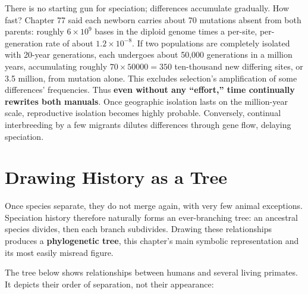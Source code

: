 \begin{qiaoliang}
There is no starting gun for speciation; differences accumulate gradually. How fast? Chapter 77 said each newborn carries about 70 mutations absent from both parents: roughly $6\times10^{9}$ bases in the diploid genome times a per-site, per-generation rate of about $1.2\times10^{-8}$. If two populations are completely isolated with 20-year generations, each undergoes about 50,000 generations in a million years, accumulating roughly $70\times 50000=350$ ten-thousand new differing sites, or 3.5 million, from mutation alone. This excludes selection's amplification of some differences' frequencies. Thus \textbf{even without any ``effort,'' time continually rewrites both manuals}. Once geographic isolation lasts on the million-year scale, reproductive isolation becomes highly probable. Conversely, continual interbreeding by a few migrants dilutes differences through gene flow, delaying speciation.
\end{qiaoliang}

\section{Drawing History as a Tree}

Once species separate, they do not merge again, with very few animal exceptions. Speciation history therefore naturally forms an ever-branching tree: an ancestral species divides, then each branch subdivides. Drawing these relationships produces a \textbf{phylogenetic tree}, this chapter's main symbolic representation and its most easily misread figure.

The tree below shows relationships between humans and several living primates. It depicts their order of separation, not their appearance:

\begin{center}
\end{center}

